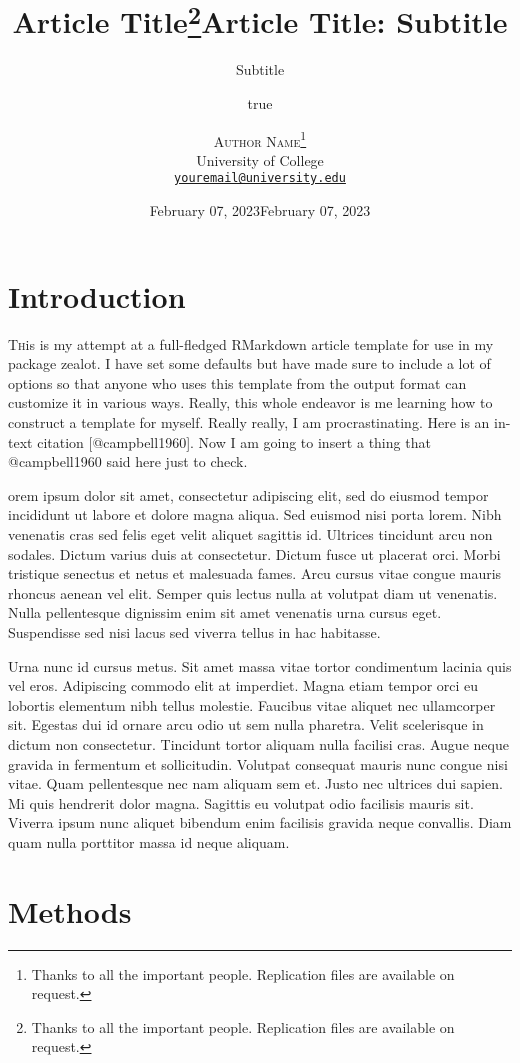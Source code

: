 \documentclass[
  11pt,
  twocolumn,
  twoside]{article}
\title{Article Title\thanks{Thanks to all the important people.
Replication files are available on request.}}
\subtitle{Subtitle}
\author{true}
\date{February 07, 2023}
\title{Article Title: Subtitle}
\author{%
\textsc{Author Name}\thanks{Thanks to all the important people.
Replication files are available on request.}  \\ [1ex]
\normalsize{University of College} \\
\normalsize{\href{mailto:youremail@university.edu}{\nolinkurl{youremail@university.edu}}}
}
\date{February 07, 2023}
\begin{document}
\maketitle

\hypertarget{introduction}{%
\section{Introduction}\label{introduction}}

\lettrine[nindent=0em,lines=3]{T}his is my attempt at a full-fledged
RMarkdown article template for use in my package zealot. I have set some
defaults but have made sure to include a lot of options so that anyone
who uses this template from the output format can customize it in
various ways. Really, this whole endeavor is me learning how to
construct a template for myself. Really really, I am procrastinating.
Here is an in-text citation {[}@campbell1960{]}. Now I am going to
insert a thing that @campbell1960 said here just to check.

orem ipsum dolor sit amet, consectetur adipiscing elit, sed do eiusmod
tempor incididunt ut labore et dolore magna aliqua. Sed euismod nisi
porta lorem. Nibh venenatis cras sed felis eget velit aliquet sagittis
id. Ultrices tincidunt arcu non sodales. Dictum varius duis at
consectetur. Dictum fusce ut placerat orci. Morbi tristique senectus et
netus et malesuada fames. Arcu cursus vitae congue mauris rhoncus aenean
vel elit. Semper quis lectus nulla at volutpat diam ut venenatis. Nulla
pellentesque dignissim enim sit amet venenatis urna cursus eget.
Suspendisse sed nisi lacus sed viverra tellus in hac habitasse.

Urna nunc id cursus metus. Sit amet massa vitae tortor condimentum
lacinia quis vel eros. Adipiscing commodo elit at imperdiet. Magna etiam
tempor orci eu lobortis elementum nibh tellus molestie. Faucibus vitae
aliquet nec ullamcorper sit. Egestas dui id ornare arcu odio ut sem
nulla pharetra. Velit scelerisque in dictum non consectetur. Tincidunt
tortor aliquam nulla facilisi cras. Augue neque gravida in fermentum et
sollicitudin. Volutpat consequat mauris nunc congue nisi vitae. Quam
pellentesque nec nam aliquam sem et. Justo nec ultrices dui sapien. Mi
quis hendrerit dolor magna. Sagittis eu volutpat odio facilisis mauris
sit. Viverra ipsum nunc aliquet bibendum enim facilisis gravida neque
convallis. Diam quam nulla porttitor massa id neque aliquam.

\hypertarget{methods}{%
\section{Methods}\label{methods}}
\end{document}
